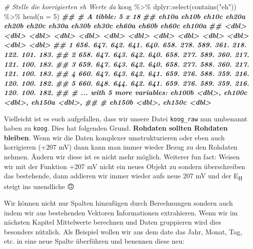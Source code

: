 \documentclass[
]{article}
\newenvironment{Shaded}{\begin{snugshade}}{\end{snugshade}}
\newcommand{\AttributeTok}[1]{\textcolor[rgb]{0.77,0.63,0.00}{#1}}
\newcommand{\CommentTok}[1]{\textcolor[rgb]{0.56,0.35,0.01}{\textit{#1}}}
\newcommand{\DecValTok}[1]{\textcolor[rgb]{0.00,0.00,0.81}{#1}}
\newcommand{\DocumentationTok}[1]{\textcolor[rgb]{0.56,0.35,0.01}{\textbf{\textit{#1}}}}
\newcommand{\FunctionTok}[1]{\textcolor[rgb]{0.00,0.00,0.00}{#1}}
\newcommand{\NormalTok}[1]{#1}
\newcommand{\SpecialCharTok}[1]{\textcolor[rgb]{0.00,0.00,0.00}{#1}}
\newcommand{\StringTok}[1]{\textcolor[rgb]{0.31,0.60,0.02}{#1}}
\begin{document}
\begin{Shaded}
\begin{Highlighting}[]
\CommentTok{\# Stelle die korrigierten eh Werte da}
\NormalTok{koog }\SpecialCharTok{\%\textgreater{}\%}
\NormalTok{  dplyr}\SpecialCharTok{::}\FunctionTok{select}\NormalTok{(}\FunctionTok{contains}\NormalTok{(}\StringTok{"eh"}\NormalTok{)) }\SpecialCharTok{\%\textgreater{}\%}
  \FunctionTok{head}\NormalTok{(}\AttributeTok{n =} \DecValTok{5}\NormalTok{)}
\DocumentationTok{\#\# \# A tibble: 5 x 18}
\DocumentationTok{\#\#   eh10a eh10b eh10c eh20a eh20b eh20c eh30a eh30b eh30c eh60a eh60b eh60c eh100a}
\DocumentationTok{\#\#   \textless{}dbl\textgreater{} \textless{}dbl\textgreater{} \textless{}dbl\textgreater{} \textless{}dbl\textgreater{} \textless{}dbl\textgreater{} \textless{}dbl\textgreater{} \textless{}dbl\textgreater{} \textless{}dbl\textgreater{} \textless{}dbl\textgreater{} \textless{}dbl\textgreater{} \textless{}dbl\textgreater{} \textless{}dbl\textgreater{}  \textless{}dbl\textgreater{}}
\DocumentationTok{\#\# 1  656.  647.  642.  641.  640.  658.  278.  589.  361.  218.  122.  101.   183.}
\DocumentationTok{\#\# 2  658.  647.  643.  642.  640.  658.  277.  589.  360.  217.  121.  100.   183.}
\DocumentationTok{\#\# 3  659.  647.  643.  642.  640.  658.  277.  588.  360.  217.  121.  100.   183.}
\DocumentationTok{\#\# 4  660.  647.  643.  642.  641.  659.  276.  588.  359.  216.  120.  100.   182.}
\DocumentationTok{\#\# 5  660.  648.  644.  642.  641.  659.  276.  589.  359.  216.  120.  100.   182.}
\DocumentationTok{\#\# \# ... with 5 more variables: eh100b \textless{}dbl\textgreater{}, eh100c \textless{}dbl\textgreater{}, eh150a \textless{}dbl\textgreater{},}
\DocumentationTok{\#\# \#   eh150b \textless{}dbl\textgreater{}, eh150c \textless{}dbl\textgreater{}}
\end{Highlighting}
\end{Shaded}

Vielleicht ist es euch aufgefallen, dass wir unsere Datei \texttt{koog\_raw} nun umbenannt haben zu \texttt{koog}. Dies hat folgenden Grund. \textbf{Rohdaten sollten Rohdaten bleiben}. Wenn wir die Daten komplexer umstrukturieren oder eben auch korrigieren (+207 mV) dann kann man immer wieder Bezug zu den Rohdaten nehmen. Ändern wir diese ist es nicht mehr möglich. Weiterer fun fact: Weisen wir mit der Funktion +207 mV nicht ein neues Objekt zu sondern überschreiben das bestehende, dann addieren wir immer wieder aufs neue 207 mV und der E\textsubscript{H} steigt ins unendliche 🙃

Wir können nicht nur Spalten hinzufügen durch Berechnungen sondern auch indem wir aus bestehenden Vektoren Informationen extrahieren. Wenn wir im nächsten Kapitel Mittelwerte berechnen und Daten gruppieren wird dies besonders nützlich. Als Beispiel wollen wir aus dem date das Jahr, Monat, Tag, etc. in eine neue Spalte überführen und benennen diese neu:
\end{document}
